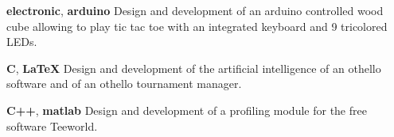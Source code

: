 \documentclass[11pt,a4paper]{moderncv}
\begin{document}

  \cvline
    {\textbf{electronic}, \textbf{arduino}}
    {
      Design and development of an arduino controlled wood cube allowing
      to play tic tac toe with an integrated keyboard and 9 tricolored LEDs.
    }{}{}

    \cvline
    {\textbf{C}, \textbf{\LaTeX{}}}{
      Design and development of the artificial intelligence of an othello
      software and of an othello tournament manager.
    }

  \cvline
    {\textbf{C++}, \textbf{matlab}}
    {
      Design and development of a profiling module for the free software
      Teeworld.
    }{}{}
\end{document}
